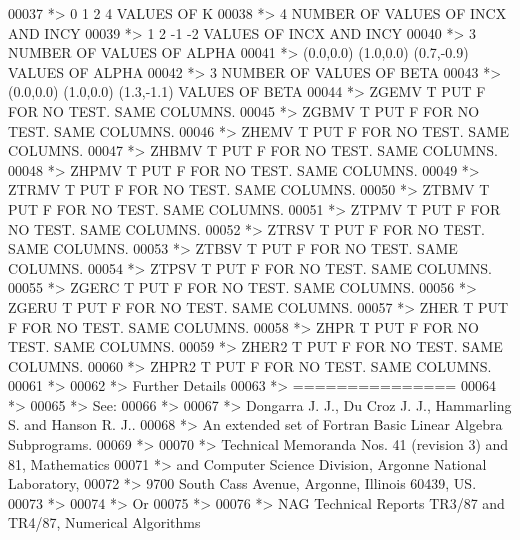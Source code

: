 \begin{DoxyCode}
00037 \textcolor{comment}{*> 0 1 2 4           VALUES OF K}
00038 \textcolor{comment}{*> 4                 NUMBER OF VALUES OF INCX AND INCY}
00039 \textcolor{comment}{*> 1 2 -1 -2         VALUES OF INCX AND INCY}
00040 \textcolor{comment}{*> 3                 NUMBER OF VALUES OF ALPHA}
00041 \textcolor{comment}{*> (0.0,0.0) (1.0,0.0) (0.7,-0.9)       VALUES OF ALPHA}
00042 \textcolor{comment}{*> 3                 NUMBER OF VALUES OF BETA}
00043 \textcolor{comment}{*> (0.0,0.0) (1.0,0.0) (1.3,-1.1)       VALUES OF BETA}
00044 \textcolor{comment}{*> ZGEMV  T PUT F FOR NO TEST. SAME COLUMNS.}
00045 \textcolor{comment}{*> ZGBMV  T PUT F FOR NO TEST. SAME COLUMNS.}
00046 \textcolor{comment}{*> ZHEMV  T PUT F FOR NO TEST. SAME COLUMNS.}
00047 \textcolor{comment}{*> ZHBMV  T PUT F FOR NO TEST. SAME COLUMNS.}
00048 \textcolor{comment}{*> ZHPMV  T PUT F FOR NO TEST. SAME COLUMNS.}
00049 \textcolor{comment}{*> ZTRMV  T PUT F FOR NO TEST. SAME COLUMNS.}
00050 \textcolor{comment}{*> ZTBMV  T PUT F FOR NO TEST. SAME COLUMNS.}
00051 \textcolor{comment}{*> ZTPMV  T PUT F FOR NO TEST. SAME COLUMNS.}
00052 \textcolor{comment}{*> ZTRSV  T PUT F FOR NO TEST. SAME COLUMNS.}
00053 \textcolor{comment}{*> ZTBSV  T PUT F FOR NO TEST. SAME COLUMNS.}
00054 \textcolor{comment}{*> ZTPSV  T PUT F FOR NO TEST. SAME COLUMNS.}
00055 \textcolor{comment}{*> ZGERC  T PUT F FOR NO TEST. SAME COLUMNS.}
00056 \textcolor{comment}{*> ZGERU  T PUT F FOR NO TEST. SAME COLUMNS.}
00057 \textcolor{comment}{*> ZHER   T PUT F FOR NO TEST. SAME COLUMNS.}
00058 \textcolor{comment}{*> ZHPR   T PUT F FOR NO TEST. SAME COLUMNS.}
00059 \textcolor{comment}{*> ZHER2  T PUT F FOR NO TEST. SAME COLUMNS.}
00060 \textcolor{comment}{*> ZHPR2  T PUT F FOR NO TEST. SAME COLUMNS.}
00061 \textcolor{comment}{*>}
00062 \textcolor{comment}{*> Further Details}
00063 \textcolor{comment}{*> ===============}
00064 \textcolor{comment}{*>}
00065 \textcolor{comment}{*>    See:}
00066 \textcolor{comment}{*>}
00067 \textcolor{comment}{*>       Dongarra J. J., Du Croz J. J., Hammarling S.  and Hanson R. J..}
00068 \textcolor{comment}{*>       An  extended  set of Fortran  Basic Linear Algebra Subprograms.}
00069 \textcolor{comment}{*>}
00070 \textcolor{comment}{*>       Technical  Memoranda  Nos. 41 (revision 3) and 81,  Mathematics}
00071 \textcolor{comment}{*>       and  Computer Science  Division,  Argonne  National Laboratory,}
00072 \textcolor{comment}{*>       9700 South Cass Avenue, Argonne, Illinois 60439, US.}
00073 \textcolor{comment}{*>}
00074 \textcolor{comment}{*>       Or}
00075 \textcolor{comment}{*>}
00076 \textcolor{comment}{*>       NAG  Technical Reports TR3/87 and TR4/87,  Numerical Algorithms}

\end{DoxyCode}

